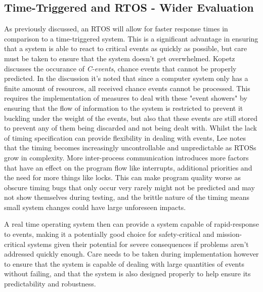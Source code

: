 \documentclass[]{report}
\begin{document}
			\subsection{Time-Triggered and RTOS - Wider Evaluation}
			As previously discussed, an RTOS will allow for faster response times in comparison to a time-triggered system. This is a significant advantage in ensuring that a system is able to react to critical events as quickly as possible, but care must be taken to ensure that the system doesn't get overwhelmed. Kopetz\cite{kopetz1991event} discusses the occurance of \textit{C-events}, chance events that cannot be properly predicted. In the discussion it's noted that since a computer system only has a finite amount of resources, all received chance events cannot be processed. This requires the implementation of measures to deal with these "event showers" by ensuring that the flow of information to the system is restricted to prevent it buckling under the weight of the events, but also that these events are still stored to prevent any of them being discarded and not being dealt with. Whilst the lack of timing specification can provide flexibility in dealing with events, Lee\cite{Lee:EECS-2009-30} notes that the timing becomes increasingly uncontrollable and unpredictable as RTOSs grow in complexity. More inter-process communication introduces more factors that have an effect on the program flow like interrupts, additional priorities and the need for more things like locks. This can make program quality worse as obscure timing bugs that only occur very rarely might not be predicted and may not show themselves during testing, and the brittle nature of the timing means small system changes could have large unforeseen impacts.
			
			A real time operating system then can provide a system capable of rapid-response to events, making it a potentially good choice for safety-critical and mission-critical systems given their potential for severe consequences if problems aren't addressed quickly enough. Care needs to be taken during implementation however to ensure that the system is capable of dealing with large quantities of events without failing, and that the system is also designed properly to help ensure its predictability and robustness.
			\medskip
			
\end{document}
